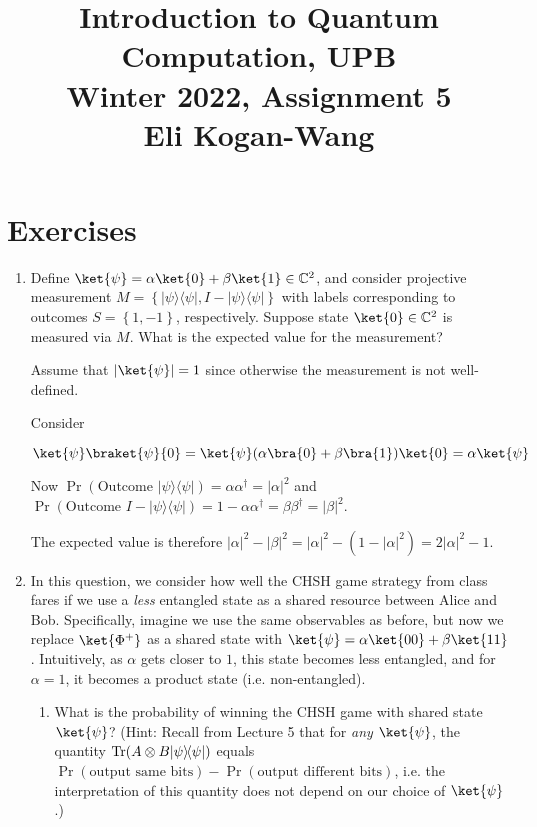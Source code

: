 \documentclass{article}
\newcommand{\ketbra}[2]{|#1\rangle\!\langle #2|}
\newcommand{\trace}{{\rm Tr}}
\newcommand{\set}[1]{{\left\{#1\right\}}}    %
\newcommand{\abs}[1]{\left\lvert #1 \right\rvert}
\newcommand{\complex}{{\mathbb C}}
\begin{document}
\title{\vspace{-10mm}Introduction to Quantum Computation, UPB\\Winter 2022, Assignment 5\\{\large Eli Kogan-Wang}}
\date{}
\maketitle


\section{Exercises}
\begin{enumerate}
  \item Define $\ket{\psi}=\alpha\ket{0}+\beta\ket{1}\in\complex^2$, and consider projective measurement $M=\set{\ketbra{\psi}{\psi},I-\ketbra{\psi}{\psi}}$ with labels corresponding to outcomes $S=\set{1,-1}$, respectively. Suppose state $\ket{0}\in\complex^2$ is measured via $M$. What is the expected value for the measurement?

        Assume that $\abs{\ket{\psi}}=1$ since otherwise the measurement is not well-defined.

        Consider

        $$\ket{\psi}\braket{\psi}{0}=\ket{\psi}(\alpha\bra{0}+\beta\bra{1})\ket{0}=\alpha\ket{\psi}$$

        Now $\Pr(\text{Outcome }\ketbra{\psi}{\psi})=\alpha\alpha^\dagger=\abs{\alpha}^2$ and $\Pr(\text{Outcome }I-\ketbra{\psi}{\psi})=1-\alpha\alpha^\dagger=\beta\beta^\dagger=\abs{\beta}^2$.

        The expected value is therefore $\abs{\alpha}^2-\abs{\beta}^2=\abs{\alpha}^2-(1-\abs{\alpha}^2)=2\abs{\alpha}^2-1$.
  \item In this question, we consider how well the CHSH game strategy from class fares if we use a \emph{less} entangled state as a shared resource between Alice and Bob. Specifically, imagine we use the same observables as before, but now we replace $\ket{\Phi^+}$ as a shared state with $\ket{\psi}=\alpha\ket{00}+\beta\ket{11}$. Intuitively, as $\alpha$ gets closer to $1$, this state becomes less entangled, and for $\alpha=1$, it becomes a product state (i.e. non-entangled).
        \begin{enumerate}
          \item What is the probability of winning the CHSH game with shared state $\ket{\psi}$? (Hint: Recall from Lecture 5 that for \emph{any} $\ket{\psi}$, the quantity $\trace(A\otimes B\ketbra{\psi}{\psi})$ equals $\Pr(\text{output same bits})-\Pr(\text{output different bits})$, i.e. the interpretation of this quantity does not depend on our choice of $\ket{\psi}$.)


\end{enumerate}
\end{enumerate}
\end{document}

